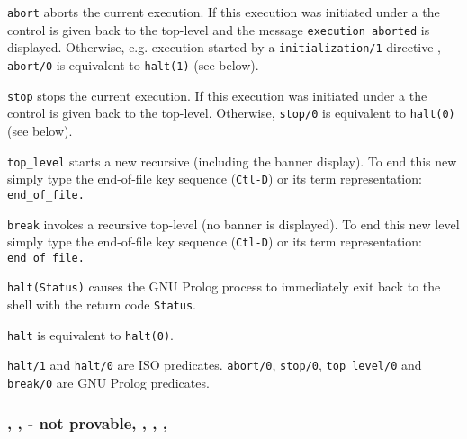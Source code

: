 \Description

\texttt{abort} aborts the current execution. If this execution was initiated
under a  the control is given back to the top-level and the
message \texttt{{\lb}execution aborted{\rb}} is displayed. Otherwise,
e.g. execution started by a \texttt{initialization/1} directive
, \texttt{abort/0} is equivalent to
\texttt{halt(1)} (see below).

\texttt{stop} stops the current execution. If this execution was initiated
under a  the control is given back to the
top-level. Otherwise, \texttt{stop/0} is equivalent to \texttt{halt(0)}
(see below).

\texttt{top\_level} starts a new recursive  (including the
banner display). To end this new  simply type the end-of-file
key sequence (\texttt{Ctl-D}) or its term representation:
\texttt{end\_of\_file.}

\texttt{break} invokes a recursive top-level (no banner is displayed). To
end this new level simply type the end-of-file key sequence (\texttt{Ctl-D})
or its term representation: \texttt{end\_of\_file.}

\texttt{halt(Status)} causes the GNU Prolog process to immediately exit back to
the shell with the return code \texttt{Status}.

\texttt{halt} is equivalent to \texttt{halt(0)}.

\begin{PlErrors}



\end{PlErrors}

\Portability

\texttt{halt/1} and \texttt{halt/0} are ISO predicates. \texttt{abort/0},
\texttt{stop/0}, \texttt{top\_level/0} and \texttt{break/0} are GNU Prolog
predicates.

\subsubsection{, ,  - not provable,
               ,
	       , , }

